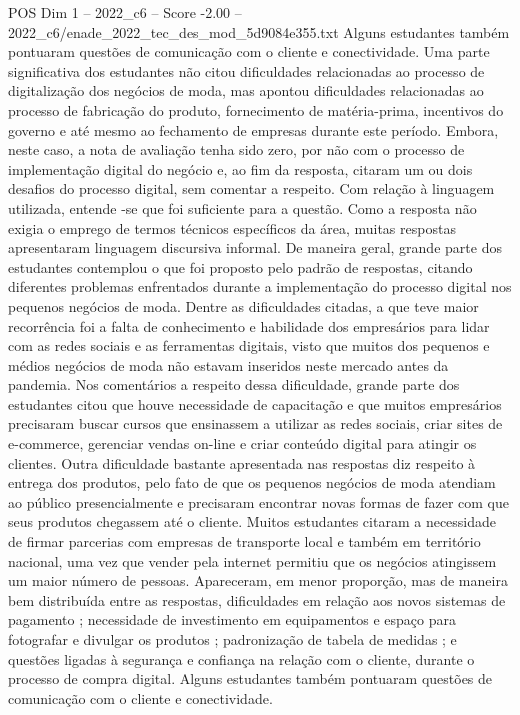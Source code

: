 \begin{textsample}{POS Dim 1 – 2022\_c6 – Score -2.00 – 2022\_c6/enade\_2022\_tec\_des\_mod\_5d9084e355.txt}
Alguns estudantes também pontuaram questões de comunicação com o cliente e conectividade.
Uma parte significativa dos estudantes não citou dificuldades relacionadas ao processo de digitalização dos negócios de moda, mas apontou dificuldades relacionadas ao processo de fabricação do produto, fornecimento de matéria-prima, incentivos do governo e até mesmo ao fechamento de empresas durante este período.
Embora, neste caso, a nota de avaliação tenha sido zero, por não com o processo de implementação digital do negócio e, ao fim da resposta, citaram um ou dois desafios do processo digital, sem comentar a respeito.
Com relação à linguagem utilizada, entende -se que foi suficiente para a questão.
Como a resposta não exigia o emprego de termos técnicos específicos da área, muitas respostas apresentaram linguagem discursiva informal.
De maneira geral, grande parte dos estudantes contemplou o que foi proposto pelo padrão de respostas, citando diferentes problemas enfrentados durante a implementação do processo digital nos pequenos negócios de moda.
Dentre as dificuldades citadas, a que teve maior recorrência foi a falta de conhecimento e habilidade dos empresários para lidar com as redes sociais e as ferramentas digitais, visto que muitos dos pequenos e médios negócios de moda não estavam inseridos neste mercado antes da pandemia.
Nos comentários a respeito dessa dificuldade, grande parte dos estudantes citou que houve necessidade de capacitação e que muitos empresários precisaram buscar cursos que ensinassem a utilizar as redes sociais, criar sites de e-commerce, gerenciar vendas on-line e criar conteúdo digital para atingir os clientes.
Outra dificuldade bastante apresentada nas respostas diz respeito à entrega dos produtos, pelo fato de que os pequenos negócios de moda atendiam ao público presencialmente e precisaram encontrar novas formas de fazer com que seus produtos chegassem até o cliente.
Muitos estudantes citaram a necessidade de firmar parcerias com empresas de transporte local e também em território nacional, uma vez que vender pela internet permitiu que os negócios atingissem um maior número de pessoas.
Apareceram, em menor proporção, mas de maneira bem distribuída entre as respostas, dificuldades em relação aos novos sistemas de pagamento ; necessidade de investimento em equipamentos e espaço para fotografar e divulgar os produtos ; padronização de tabela de medidas ; e questões ligadas à segurança e confiança na relação com o cliente, durante o processo de compra digital.
Alguns estudantes também pontuaram questões de comunicação com o cliente e conectividade.

\end{textsample}
